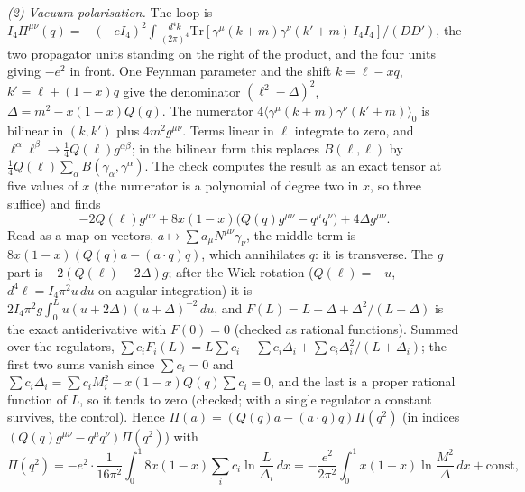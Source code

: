 \emph{(2) Vacuum polarisation.} The loop is $I_{4}\Pi^{\mu\nu}(q) = -(-eI_{4})^{2}\int\frac{d^{4}k}{(2\pi)^{4}}\mathrm{Tr}[\gamma^{\mu}(k+m)\gamma^{\nu}(k'+m)\,I_{4}I_{4}]/(D D')$, the two propagator units standing on the right of the product, and the four units giving $-e^{2}$ in front. One Feynman parameter and the shift $k = \ell - xq$, $k' = \ell + (1-x)q$ give the denominator $(\ell^{2} - \Delta)^{2}$, $\Delta = m^{2} - x(1-x)Q(q)$. The numerator $4\langle\gamma^{\mu}(k+m)\gamma^{\nu}(k'+m)\rangle_{0}$ is bilinear in $(k, k')$ plus $4m^{2}g^{\mu\nu}$. Terms linear in $\ell$ integrate to zero, and $\ell^{\alpha}\ell^{\beta} \to \tfrac14 Q(\ell)g^{\alpha\beta}$; in the bilinear form this replaces $B(\ell, \ell)$ by $\tfrac14 Q(\ell)\sum_{\alpha}B(\gamma_{\alpha}, \gamma^{\alpha})$. The check computes the result as an exact tensor at five values of $x$ (the numerator is a polynomial of degree two in $x$, so three suffice) and finds
\[
-2Q(\ell)g^{\mu\nu} + 8x(1-x)\bigl(Q(q)g^{\mu\nu} - q^{\mu}q^{\nu}\bigr) + 4\Delta g^{\mu\nu}.
\]
Read as a map on vectors, $a \mapsto \sum a_{\mu}N^{\mu\nu}\gamma_{\nu}$, the middle term is $8x(1-x)(Q(q)a - (a\cdot q)q)$, which annihilates $q$: it is transverse. The $g$ part is $-2(Q(\ell) - 2\Delta)g$; after the Wick rotation ($Q(\ell) = -u$, $d^{4}\ell = I_{4}\pi^{2}u\,du$ on angular integration) it is $2I_{4}\pi^{2}g\int_{0}^{L}u(u + 2\Delta)(u + \Delta)^{-2}\,du$, and $F(L) = L - \Delta + \Delta^{2}/(L+\Delta)$ is the exact antiderivative with $F(0) = 0$ (checked as rational functions). Summed over the regulators, $\sum c_{i}F_{i}(L) = L\sum c_{i} - \sum c_{i}\Delta_{i} + \sum c_{i}\Delta_{i}^{2}/(L + \Delta_{i})$; the first two sums vanish since $\sum c_{i} = 0$ and $\sum c_{i}\Delta_{i} = \sum c_{i}M_{i}^{2} - x(1-x)Q(q)\sum c_{i} = 0$, and the last is a proper rational function of $L$, so it tends to zero (checked; with a single regulator a constant survives, the control). Hence $\Pi(a) = (Q(q)a - (a\cdot q)q)\Pi(q^{2})$ (in indices $(Q(q)g^{\mu\nu} - q^{\mu}q^{\nu})\Pi(q^{2})$) with
\[
\Pi(q^{2}) = -e^{2}\cdot\frac{1}{16\pi^{2}}\int_{0}^{1}8x(1-x)\sum_{i}c_{i}\ln\frac{L}{\Delta_{i}}\,dx = -\frac{e^{2}}{2\pi^{2}}\int_{0}^{1}x(1-x)\ln\frac{M^{2}}{\Delta}\,dx + \text{const},
\]
